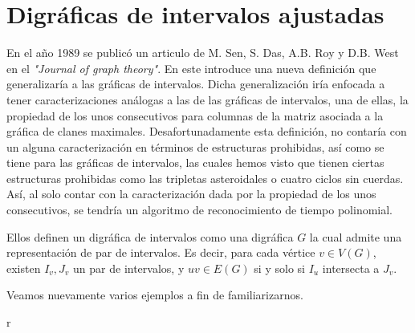 \chapter{Digráficas de intervalos ajustadas}
\label{cap:DigrafIntAj}

En el año 1989 se publicó un articulo de M. Sen, S. Das, A.B. Roy y D.B. West en el  \textit{"Journal of graph theory"}. En este introduce una nueva definición que generalizaría a las gráficas de intervalos. Dicha generalización iría enfocada a tener caracterizaciones análogas a las de las gráficas de intervalos, una de ellas, la propiedad de los unos consecutivos para columnas de la matriz asociada a la gráfica de clanes maximales. 
Desafortunadamente esta definición, no contaría con un alguna caracterización en términos de estructuras prohibidas, así como se tiene para las gráficas de intervalos, las cuales hemos visto que tienen ciertas estructuras prohibidas como las tripletas asteroidales o cuatro ciclos sin cuerdas. 
Así, al solo contar con la caracterización dada por la propiedad de los unos consecutivos, se tendría un algoritmo de reconocimiento de tiempo polinomial.

Ellos definen un digráfica de intervalos como una digráfica $G$ la cual admite una representación de par de intervalos. Es decir, para cada vértice $v\in V(G)$, existen $I_v,J_v$ un par de intervalos, y $uv\in E(G)$ si y solo si $I_u$ intersecta a $J_v$. 

Veamos nuevamente varios ejemplos a fin de familiarizarnos.

r